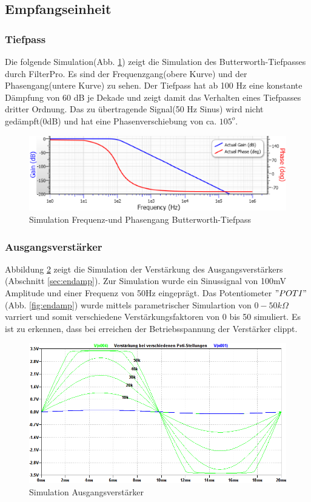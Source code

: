 \subsection{Empfangseinheit}
\subsubsection{Tiefpass}
Die folgende Simulation(Abb. \ref{fig:frequencyResponse}) zeigt die Simulation des Butterworth-Tiefpasses durch FilterPro. Es sind der Frequenzgang(obere Kurve) und der Phasengang(untere Kurve) zu sehen. Der Tiefpass hat ab 100 Hz eine konstante Dämpfung von 60 dB je Dekade und zeigt damit das Verhalten eines Tiefpasses dritter Ordnung. Das zu übertragende Signal(50 Hz  Sinus) wird nicht gedämpft(0dB) und hat eine Phasenverschiebung von ca. $105^o$.
\begin{figure}[H]
\centering
\includegraphics[scale=0.35]{gfx/simRx/FilterPro.png}
\caption{Simulation Frequenz-und Phasengang Butterworth-Tiefpass}
	\label{fig:frequencyResponse} 
\end{figure}


\subsubsection{Ausgangsverstärker}
Abbildung \ref{fig:amplifier} zeigt die Simulation der Verstärkung des Ausgangsverstärkers (Abschnitt \ref{sec:endamp}). Zur Simulation wurde ein Sinussignal von 100mV Amplitude und einer Frequenz von 50Hz eingeprägt. Das Potentiometer $"POTI"$(Abb. \ref{fig:endamp}) wurde mittels parametrischer Simulartion von $0 - 50k\Omega$ varriert und somit verschiedene Verstärkungsfaktoren von 0 bis 50 simuliert. Es ist zu erkennen, dass bei erreichen der Betriebsspannung der Verstärker clippt. 
\begin{figure}[H]
\centering
\includegraphics[scale=0.47]{gfx/simRx/amplification.png}
\caption{Simulation Ausgangsverstärker}
	\label{fig:amplifier} 
\end{figure}
